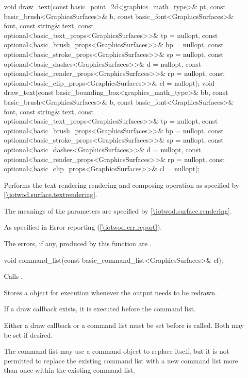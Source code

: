 %
\begin{itemdecl}
void draw_text(const basic_point_2d<graphics_math_type>& pt,
  const basic_brush<GraphicsSurfaces>& b,
  const basic_font<GraphicsSurfaces>& font, const string& text,
  const optional<basic_text_props<GraphicsSurfaces>>& tp = nullopt,
  const optional<basic_brush_props<GraphicsSurfaces>>& bp = nullopt,
  const optional<basic_stroke_props<GraphicsSurfaces>>& sp = nullopt,
  const optional<basic_dashes<GraphicsSurfaces>>& d = nullopt,
  const optional<basic_render_props<GraphicsSurfaces>>& rp = nullopt,
  const optional<basic_clip_props<GraphicsSurfaces>>& cl = nullopt);
void draw_text(const basic_bounding_box<graphics_math_type>& bb,
  const basic_brush<GraphicsSurfaces>& b,
  const basic_font<GraphicsSurfaces>& font, const string& text,
  const optional<basic_text_props<GraphicsSurfaces>>& tp = nullopt,
  const optional<basic_brush_props<GraphicsSurfaces>>& bp = nullopt,
  const optional<basic_stroke_props<GraphicsSurfaces>>& sp = nullopt,
  const optional<basic_dashes<GraphicsSurfaces>>& d = nullopt,
  const optional<basic_render_props<GraphicsSurfaces>>& rp = nullopt,
  const optional<basic_clip_props<GraphicsSurfaces>>& cl = nullopt);
\end{itemdecl}
\begin{itemdescr}
\pnum
\effects
Performs the text rendering rendering and composing operation as specified by \ref{\iotwod.surface.textrendering}.

\pnum
The meanings of the parameters are specified by \ref{\iotwod.surface.rendering}.

\pnum
\throws
As specified in Error reporting (\ref{\iotwod.err.report}).

\pnum
\errors

The errors, if any, produced by this function are .
\end{itemdescr}

%
\begin{itemdecl}
void command_list(const basic_command_list<GraphicsSurfaces>& cl);
\end{itemdecl}
\begin{itemdescr}
\pnum
\effects Calls .

\pnum
\remarks Stores a  object for execution whenever the output needs to be redrawn.

\pnum
If a draw callback exists, it is executed before the command list.

\pnum
Either a draw callback or a command list must be set before  is called. Both may be set if desired.

\pnum
The command list may use a  command object to replace itself, but it is not permitted to replace the existing command list with a new command list more than once within the existing command list.
\end{itemdescr}

